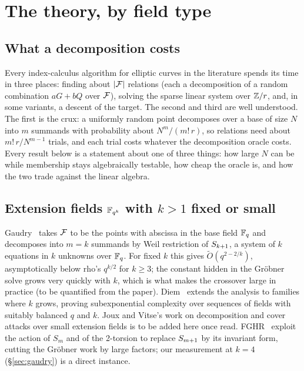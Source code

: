 \section{The theory, by field type}\label{sec:theory}


\subsection{What a decomposition costs}

Every index-calculus algorithm for elliptic curves in the literature
spends its time in three places: finding about $\lvert \mathcal{F} \rvert$ relations (each
a decomposition of a random combination $aG+bQ$ over $\mathcal{F}$), solving the
sparse linear system over $\mathbb{Z}/r$, and, in some variants, a descent of
the target. The second and third are well understood. The first is the
crux: a uniformly random point decomposes over a base of size $N$ into $m$
summands with probability about $N^m/(m!\,r)$, so relations need about
$m!\,r/N^{m-1}$ trials, and each trial costs whatever the decomposition
oracle costs. Every result below is a statement about one of three things:
how large $N$ can be while membership stays algebraically testable, how
cheap the oracle is, and how the two trade against the linear algebra.

\subsection{Extension fields $\mathbb{F}_{q^k}$ with $k>1$ fixed or small}

Gaudry~\cite{gaudry2009} takes $\mathcal{F}$ to be the points with abscissa in the
base field $\mathbb{F}_q$ and decomposes into $m=k$ summands by Weil restriction of
$S_{k+1}$, a system of $k$ equations in $k$ unknowns over $\mathbb{F}_q$. For
fixed $k$ this gives $\tilde O(q^{2-2/k})$, asymptotically below rho's
$q^{k/2}$ for $k\ge3$; the constant hidden in the Gr\"obner solve grows
very quickly with $k$, which is what makes the crossover large in
practice (to be quantified from the paper).
Diem~\cite{diem2011} extends the analysis to families where $k$ grows,
proving subexponential complexity over sequences of fields with suitably
balanced $q$ and $k$. Joux and Vitse's work on decomposition and cover
attacks over small extension fields is to be added here once read. FGHR~\cite{fghr2014} exploit the action of $S_m$ and of
the 2-torsion to replace $S_{m+1}$ by its invariant form, cutting the
Gr\"obner work by large factors; our measurement at $k=4$
(\S\ref{sec:gaudry}) is a direct instance.

